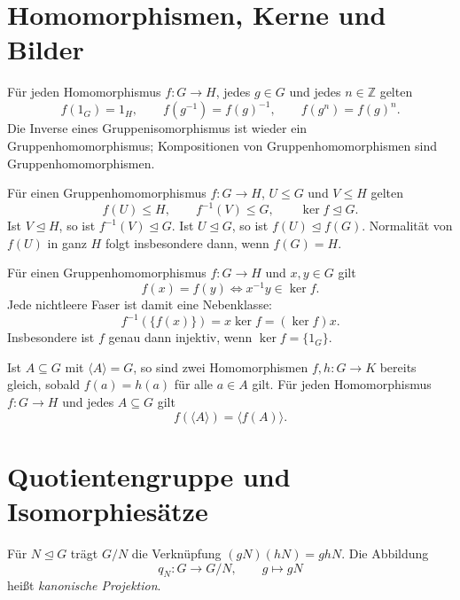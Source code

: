 \section{Homomorphismen, Kerne und Bilder}



\begin{theorem}
Für jeden Homomorphismus \(f:G\to H\), jedes \(g\in G\)
und jedes \(n\in\mathbb Z\) gelten
\[
 f(1_G)=1_H,\qquad f(g^{-1})=f(g)^{-1},\qquad f(g^n)=f(g)^n.
\]
Die Inverse eines Gruppenisomorphismus ist wieder ein
Gruppenhomomorphismus; Kompositionen von Gruppenhomomorphismen
sind Gruppenhomomorphismen. \cite{project40,milne}
\end{theorem}

\begin{theorem}
Für einen Gruppenhomomorphismus \(f:G\to H\), \(U\leq G\) und \(V\leq H\) gelten
\[
 f(U)\leq H,\qquad f^{-1}(V)\leq G,\qquad
 \ker f\trianglelefteq G.
\]
Ist \(V\trianglelefteq H\), so ist \(f^{-1}(V)\trianglelefteq G\).
Ist \(U\trianglelefteq G\), so ist \(f(U)\trianglelefteq f(G)\).
Normalität von \(f(U)\) in ganz \(H\) folgt insbesondere dann,
wenn \(f(G)=H\). \cite{conradhom,milne}
\end{theorem}

\begin{theorem}
Für einen Gruppenhomomorphismus \(f:G\to H\) und \(x,y\in G\) gilt
\[
 f(x)=f(y)\iff x^{-1}y\in\ker f.
\]
Jede nichtleere Faser ist damit eine Nebenklasse:
\[
 f^{-1}(\{f(x)\})=x\ker f=(\ker f)x.
\]
Insbesondere ist \(f\) genau dann injektiv, wenn \(\ker f=\{1_G\}\).
\cite{conradhom}
\end{theorem}

\begin{theorem}
Ist \(A\subseteq G\) mit \(\langle A\rangle=G\), so sind zwei
Homomorphismen \(f,h:G\to K\) bereits gleich, sobald
\(f(a)=h(a)\) für alle \(a\in A\) gilt.
Für jeden Homomorphismus \(f:G\to H\) und jedes \(A\subseteq G\) gilt
\[
 f(\langle A\rangle)=\langle f(A)\rangle.
\]
\cite{milne,conradhom}
\end{theorem}

\section{Quotientengruppe und Isomorphiesätze}

\begin{definition}
Für \(N\trianglelefteq G\) trägt \(G/N\) die Verknüpfung
\((gN)(hN)=ghN\). Die Abbildung
\[
 q_N:G\longrightarrow G/N,\qquad g\longmapsto gN
\]
heißt \emph{kanonische Projektion}.
\end{definition}

